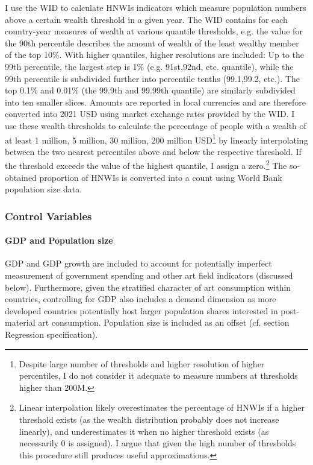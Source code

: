 \documentclass[11pt]{article}
\begin{document}
I use the WID to calculate HNWIs indicators which measure population numbers above a certain wealth threshold in a given year. 
The WID contains for each country-year measures of wealth at various quantile thresholds, e.g. the value for the 90th percentile describes the amount of wealth of the least wealthy member of the top 10\%.
With higher quantiles, higher resolutions are included: Up to the 99th percentile, the largest step is 1\% (e.g. 91st,92nd, etc. quantile), while the 99th percentile is subdivided further into percentile tenths (99.1,99.2, etc.).
The top 0.1\% and 0.01\% (the 99.9th and 99.99th quantile) are similarly subdivided into ten smaller slices.
Amounts are reported in local currencies and are therefore converted into 2021 USD using market exchange rates provided by the WID.
I use these wealth thresholds to calculate the percentage of people with a wealth of at least 1 million, 5 million, 30 million, 200 million USD\footnote{Despite large number of thresholds and higher resolution of higher percentiles, I do not consider it adequate to measure numbers at thresholds higher than 200M.} by linearly interpolating between the two nearest percentiles above and below the respective threshold.
If the threshold exceeds the value of the highest quantile, I assign a zero.\footnote{Linear interpolation likely overestimates the percentage of HNWIs if a higher threshold exists (as the wealth distribution probably does not increase linearly), and underestimates it when no higher threshold exists (as necessarily 0 is assigned). I argue that given the high number of thresholds this procedure still produces useful approximations.}
The so-obtained proportion of HNWIs is converted into a count using World Bank population size data.


\subsubsection*{Control Variables}

\paragraph*{GDP and Population size}

GDP and GDP growth are included to account for potentially imperfect measurement of government spending and other art field indicators (discussed below). 
Furthermore, given the stratified character of art consumption \parencite{Bourdieu_1984_distinction} within countries, controlling for GDP also includes a demand dimension as more developed countries potentially host larger population shares interested in post-material art consumption.
Population size is included as an offset (cf. section Regression specification). 
\end{document}
